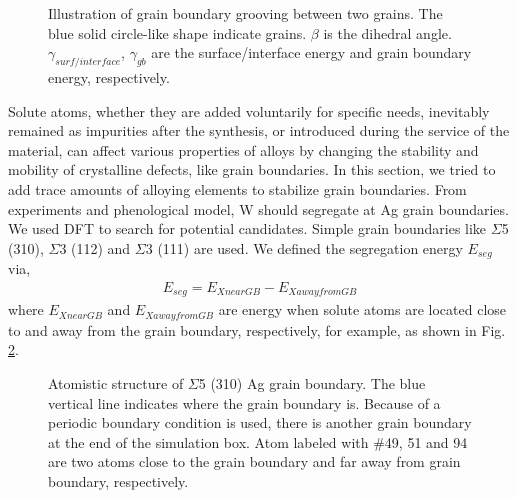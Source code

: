 \begingroup
\begin{figure}[!ht]
  \centering
  \caption[Illustration of grain boundary grooving effects.]{Illustration of grain boundary grooving between two grains. The blue solid circle-like shape indicate grains. $\beta$ is the dihedral angle. $\gamma_{surf/interface}$, $\gamma_{gb}$ are the surface/interface energy and grain boundary energy, respectively.}
  \label{Chap:Ag/ZnO:fig15}
\end{figure}
\endgroup


Solute atoms, whether they are added voluntarily for specific needs, inevitably remained as impurities after the synthesis, or introduced during the service of the material, can affect various properties of alloys by changing the stability and mobility of crystalline defects, like grain boundaries. In this section, we tried to add trace amounts of alloying elements to stabilize grain boundaries. From experiments and phenological model, W should segregate at Ag grain boundaries. \cite{chookajorn2012design,jiao2018nanocrystalline} We used \ac{DFT} to search for potential candidates. Simple grain boundaries like $\Sigma$5 (310), $\Sigma$3 (112) and $\Sigma$3 (111) are used. We defined the segregation energy $E_{seg}$ via,
\begin{align}
E_{seg} = E_{X near GB} - E_{X away from GB}
 \label{Chap:Ag/ZnO:eq:gb_seg}
\end{align}
where $E_{X near GB}$ and $E_{X away from GB}$ are energy when solute atoms are located close to and away from the grain boundary, respectively, for example, as shown in Fig. \ref{Chap:Ag/ZnO:fig16}.


\begingroup
\begin{figure}[!ht]
  \centering
  \caption[Atomistic structure of $\Sigma$5 (310) Ag grain boundary.]{Atomistic structure of $\Sigma$5 (310) Ag grain boundary. The blue vertical line indicates where the grain boundary is. Because of a periodic boundary condition is used, there is another grain boundary at the end of the simulation box. Atom labeled with \#49, 51 and 94 are two atoms close to the grain boundary and far away from grain boundary, respectively.}
  \label{Chap:Ag/ZnO:fig16}
\end{figure}
\endgroup


